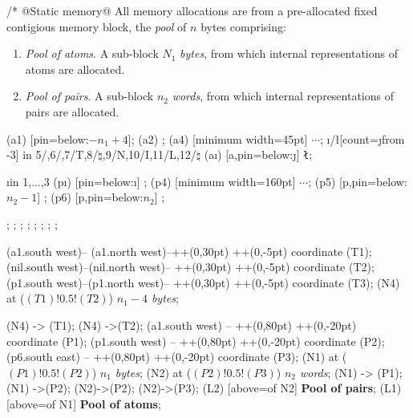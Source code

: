 \documentclass[12pt]{article}
\newenvironment{layout}{\quote\tikzpicture[start chain=going right,x=13pt,y=13pt]\scriptsize}
                       {\endtikzpicture\endquote}
\begin{document}
\begin{code}[literate=
    {*}{$\times$}{1}
    {=}{$\equiv$ }{1}{*}{$\times$}{1}
    {1<<13}{$2^{13}$}{3}
    {1<<15}{$2^{15}$}{3}
    {1a<<$H_x$}{$2^{H_x}$}{3}
]
/* @Static memory@ 
All memory allocations are from a pre-allocated fixed 
contigious memory block, the \emph{pool} of $n$ bytes comprising:
\begin{enumerate} 
\item \emph{Pool of atoms}. A sub-block $N_1$ \emph{bytes}, from which 
internal representations of atoms are allocated. 
\item \emph{Pool of pairs}. A sub-block $n_2$ \emph{words},
from which internal representations of pairs are allocated. 
\end{enumerate}

\begin{layout}
\node[a] (a1) [pin=below:$-n_1+4$]{};
\node[a] (a2) {};
\node[a] (a4) [minimum width=45pt] {$\cdots$};
\foreach \i/\l[count=\j from -3] in {5/,6/,7/T,8/$\natural$,9/N,10/I,11/L,12/$\natural$} \node (a\i) [a,pin=below:{\j}] {\tt\l};

\foreach \i in {1,...,3} \node[p] (p\i) [pin=below:{\i}] {};
\node[p] (p4) [minimum width=160pt] {$\cdots$};
\node[p] (p5) [p,pin=below:{$n_2-1$}] {};
\node[p] (p6) [p,pin=below:{$n_2$}] {};

;
;
\node[p,draw,fill=olive!30,above=of p1,pin=above:1] {};
\node[p,draw,fill=olive!30,above=of p2,pin=above:2] {};
\node[p,draw,fill=olive!30,above=of p3,pin=above:2] {};
\node[p,draw,fill=olive!30,above=of p4,minimum width=160pt] {};
\node[p,draw,fill=olive!30,above=of p5,pin=above:$n_2-1$] {};
\node[p,draw,fill=olive!30,above=of p6,pin=above:$n_2$] {};

 (a1.south west)-- (a1.north west)--++(0,30pt) ++(0,-5pt) coordinate (T1);
 (nil.south west)--(nil.north west)-- ++(0,30pt) ++(0,-5pt) coordinate (T2);
 (p1.south west)--(p1.north west)-- ++(0,30pt) ++(0,-5pt) coordinate (T3);
\node (N4) at ($(T1)!0.5!(T2)$) {\it$n_1-4$ bytes};

\draw[m] (N4) -> (T1);
\draw[m] (N4) ->(T2);
 (a1.south west) -- ++(0,80pt) ++(0,-20pt) coordinate (P1);
 (p1.south west) -- ++(0,80pt) ++(0,-20pt) coordinate (P2);
 (p6.south east) -- ++(0,80pt) ++(0,-20pt) coordinate (P3);
\node (N1) at ($(P1)!0.5!(P2)$) {\it$n_1$ bytes};
\node (N2) at ($(P2)!0.5!(P3)$) {\it$n_2$ words};
\draw[m] (N1) -> (P1);
\draw[m] (N1) ->(P2);
\draw[m] (N2)->(P2);
\draw[m] (N2)->(P3); 
\node(L2) [above=of N2]  {\bf Pool of pairs}; 
\node(L1) [above=of N1]  {\bf Pool of atoms}; 


\end{layout}
\end{code}
\end{document}
